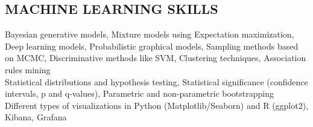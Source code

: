 \documentclass[margin, 10pt]{res} %
\begin{document}
\begin{resume}
\section{MACHINE LEARNING SKILLS}
{\bf \color{Brown}{ML areas:}} 
Bayesian generative models, Mixture models using Expectation maximization, Deep learning models, Probabilistic graphical models, Sampling methods based on MCMC, 
Discriminative methods like SVM, Clustering techniques, Association rules mining   \\
{\bf \color{Brown}{Statistical Theory:}} Statistical distributions and hypothesis testing, Statistical significance (confidence intervals, p and q-values), Parametric and non-parametric bootstrapping \\
{\bf \color{Brown}{Visualization and reporting:}} Different types of visualizations in Python (Matplotlib/Seaborn) and R (ggplot2), Kibana, Grafana



\end{resume}
\end{document}

